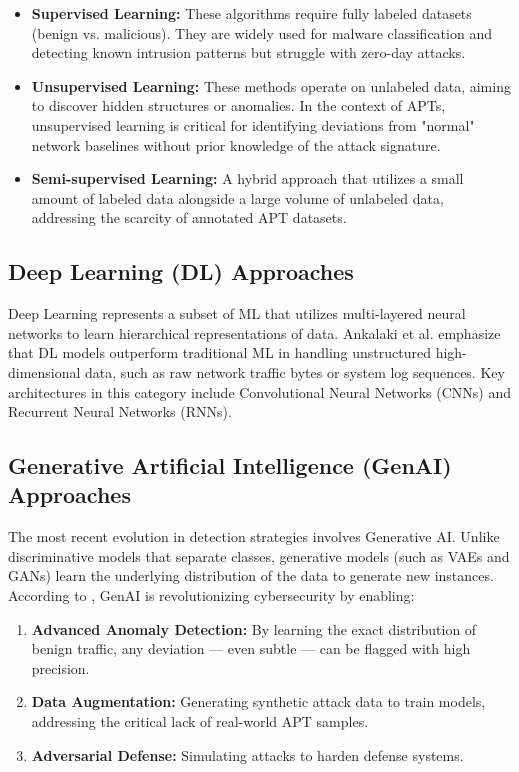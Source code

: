 \begin{itemize}
\item \textbf{Supervised Learning:} These algorithms require fully labeled datasets (benign vs. malicious). They are widely used for malware classification and detecting known intrusion patterns but struggle with zero-day attacks.
\item \textbf{Unsupervised Learning:} These methods operate on unlabeled data, aiming to discover hidden structures or anomalies. In the context of APTs, unsupervised learning is critical for identifying deviations from "normal" network baselines without prior knowledge of the attack signature.
\item \textbf{Semi-supervised Learning:} A hybrid approach that utilizes a small amount of labeled data alongside a large volume of unlabeled data, addressing the scarcity of annotated APT datasets.
\end{itemize}

\subsection{Deep Learning (DL) Approaches}

Deep Learning represents a subset of ML that utilizes multi-layered neural networks to learn hierarchical representations of data. Ankalaki et al. \cite{ankalaki2025cyber} emphasize that DL models outperform traditional ML in handling unstructured high-dimensional data, such as raw network traffic bytes or system log sequences. Key architectures in this category include Convolutional Neural Networks (CNNs) and Recurrent Neural Networks (RNNs).

\subsection{Generative Artificial Intelligence (GenAI) Approaches}

The most recent evolution in detection strategies involves Generative AI. Unlike discriminative models that separate classes, generative models (such as VAEs and GANs) learn the underlying distribution of the data to generate new instances. According to \cite{ankalaki2025cyber}, GenAI is revolutionizing cybersecurity by enabling:

\begin{enumerate}
\item \textbf{Advanced Anomaly Detection:} By learning the exact distribution of benign traffic, any deviation — even subtle — can be flagged with high precision.
\item \textbf{Data Augmentation:} Generating synthetic attack data to train models, addressing the critical lack of real-world APT samples.
\item \textbf{Adversarial Defense:} Simulating attacks to harden defense systems.
\end{enumerate}

